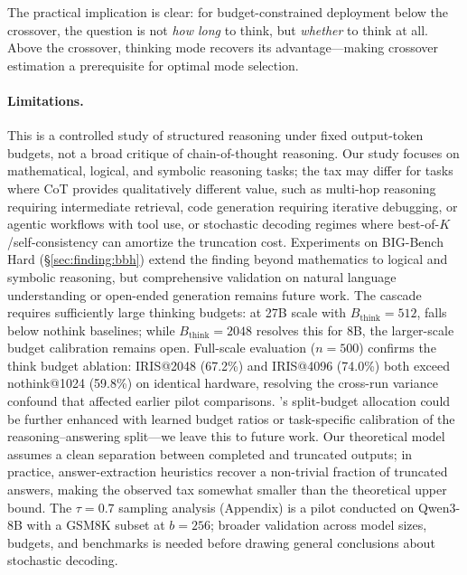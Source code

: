 The practical implication is clear: for budget-constrained deployment below the crossover, the question is not \emph{how long} to think, but \emph{whether} to think at all.
Above the crossover, thinking mode recovers its advantage---making crossover estimation a prerequisite for optimal mode selection.

\paragraph{Limitations.}
This is a controlled study of structured reasoning under fixed output-token budgets, not a broad critique of chain-of-thought reasoning.
Our study focuses on mathematical, logical, and symbolic reasoning tasks; the tax may differ for tasks where CoT provides qualitatively different value, such as multi-hop reasoning requiring intermediate retrieval, code generation requiring iterative debugging, or agentic workflows with tool use, or stochastic decoding regimes where best-of-$K$/self-consistency can amortize the truncation cost.
Experiments on BIG-Bench Hard (\S\ref{sec:finding:bbh}) extend the finding beyond mathematics to logical and symbolic reasoning, but comprehensive validation on natural language understanding or open-ended generation remains future work.
The cascade requires sufficiently large thinking budgets: at 27B scale with $B_{\text{think}}{=}512$, \method{} falls below nothink baselines; while $B_{\text{think}}{=}2048$ resolves this for 8B, the larger-scale budget calibration remains open.
Full-scale evaluation ($n{=}500$) confirms the think budget ablation: IRIS@2048 (67.2\%) and IRIS@4096 (74.0\%) both exceed nothink@1024 (59.8\%) on identical hardware, resolving the cross-run variance confound that affected earlier pilot comparisons.
\method{}'s split-budget allocation could be further enhanced with learned budget ratios or task-specific calibration of the reasoning--answering split---we leave this to future work.
Our theoretical model assumes a clean separation between completed and truncated outputs; in practice, answer-extraction heuristics recover a non-trivial fraction of truncated answers, making the observed tax somewhat smaller than the theoretical upper bound.
The $\tau{=}0.7$ sampling analysis (Appendix) is a pilot conducted on Qwen3-8B with a GSM8K subset at $b{=}256$; broader validation across model sizes, budgets, and benchmarks is needed before drawing general conclusions about stochastic decoding.

